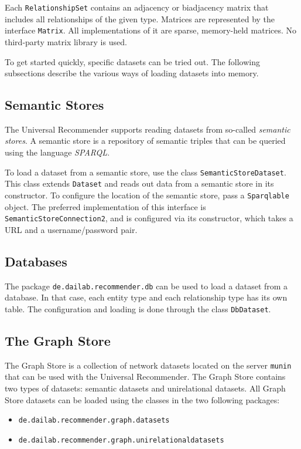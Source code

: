 \documentclass{article}
\begin{document}
Each \texttt{RelationshipSet} contains an adjacency or biadjacency
matrix that includes all relationships of the given type.  
Matrices are represented by the interface \texttt{Matrix}.  All
implementations of it are sparse, memory-held matrices.
No third-party matrix library is used.

To get started quickly, specific datasets can be tried out.  The
following subsections describe the various ways of loading datasets into
memory. 

\subsection{Semantic Stores}
The Universal Recommender supports reading datasets from so-called
\emph{semantic stores}.  A semantic store is a repository of semantic
triples that can be queried using the language \emph{SPARQL}.  

To load a dataset from a semantic store, use the class
\texttt{SemanticStoreDataset}.  This class extends \texttt{Dataset} and reads
out data from a semantic store in its constructor.  
To configure the location of the semantic store, pass a
\texttt{Sparqlable} object.  The preferred implementation of this
interface is \texttt{SemanticStoreConnection2}, and is configured via
its constructor, which takes a URL and a username/password pair. 

\subsection{Databases}
The package \texttt{de.dailab.recommender.db} can be used to load a
dataset from a database.  In that case, each entity type and each
relationship type has its own table.  The configuration and loading is
done through the class \texttt{DbDataset}.  

\subsection{The Graph Store}
The Graph Store is a collection of network datasets located on the
server \texttt{munin} that can be used
with the Universal Recommender.  The Graph Store contains two types of
datasets:  semantic datasets and unirelational datasets.  All Graph
Store datasets can be loaded using the classes in the two following
packages: 
\begin{itemize}
\item \texttt{de.dailab.recommender.graph.datasets}
\item \texttt{de.dailab.recommender.graph.unirelationaldatasets}
\end{itemize}
\end{document}
